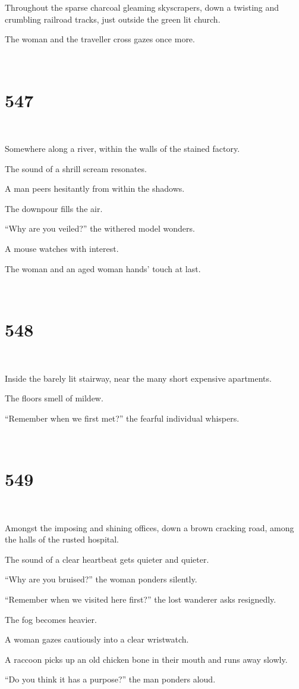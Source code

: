 \documentclass{report}
\begin{document}
Throughout the sparse charcoal gleaming skyscrapers, down a twisting and crumbling railroad tracks, just outside the green lit church.

The woman and the traveller cross gazes once more.

~
\chapter*{547}
~

Somewhere along a river, within the walls of the stained factory.

The sound of a shrill scream resonates.

A man peers hesitantly from within the shadows.

The downpour fills the air.

``Why are you veiled?'' the withered model wonders.

A mouse watches with interest.

The woman and an aged woman hands' touch at last.

~
\chapter*{548}
~

Inside the barely lit stairway, near the many short expensive apartments.

The floors smell of mildew.

``Remember when we first met?'' the fearful individual whispers.

~
\chapter*{549}
~

Amongst the imposing and shining offices, down a brown cracking road, among the halls of the rusted hospital.

The sound of a clear heartbeat gets quieter and quieter.

``Why are you bruised?'' the woman ponders silently.

``Remember when we visited here first?'' the lost wanderer asks resignedly.

The fog becomes heavier.

A woman gazes cautiously into a clear wristwatch.

A raccoon picks up an old chicken bone in their mouth and runs away slowly.

``Do you think it has a purpose?'' the man ponders aloud.
\end{document}
